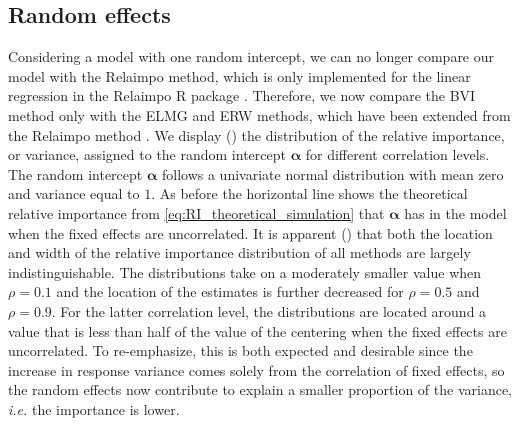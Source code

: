 \subsection{Random effects}
\label{sec:relimp_random}
Considering a model with one random intercept, we can no longer compare our model with the Relaimpo method, which is only implemented for the linear regression in the Relaimpo R package \citep{gromping_relaimpo}. Therefore, we now compare the BVI method only with the ELMG and ERW methods, which have been extended from the Relaimpo method \citep{matre}.
We display () the distribution of the relative importance, or variance, assigned to the random intercept $\boldsymbol{\alpha}$ for different correlation levels. 
The random intercept $\boldsymbol{\alpha}$ follows a univariate normal distribution with mean zero and variance equal to $1$.
As before the horizontal line shows the theoretical relative importance from \eqref{eq:RI_theoretical_simulation} that $\boldsymbol{\alpha}$ has in the model when the fixed effects are uncorrelated.
\newline
\newline
It is apparent () that both the location and width of the relative importance distribution of all methods are largely indistinguishable. 
The distributions take on a moderately smaller value when $\rho=0.1$ and the location of the estimates is further decreased for $\rho=0.5$ and $\rho=0.9$. 
For the latter correlation level, the distributions are located around a value that is less than half of the value of the centering when the fixed effects are uncorrelated. 
To re-emphasize, this is both expected and desirable since the increase in response variance comes solely from the correlation of fixed effects, so the random effects now contribute to explain a smaller proportion of the variance, \textit{i.e.} the importance is lower.

